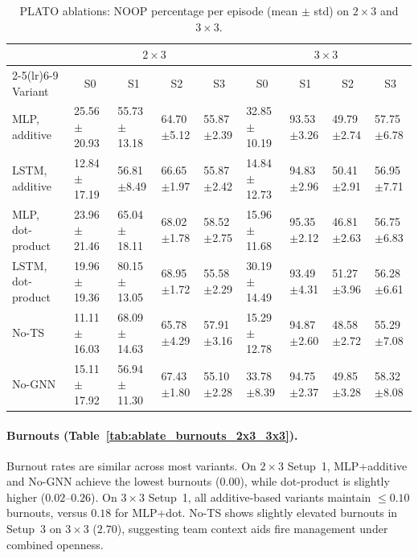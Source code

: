 \begin{table}[h]
\centering
\small
\setlength{\tabcolsep}{1.4pt}
\renewcommand{\arraystretch}{1.02}
\begin{tabular}{@{\hspace{2pt}}l|l|l|l|l||l|l|l|l@{\hspace{2pt}}}
\toprule
& \multicolumn{4}{c||}{$2\times 3$} & \multicolumn{4}{c}{$3\times 3$} \\
\cmidrule(lr){2-5}\cmidrule(lr){6-9}
Variant & \multicolumn{1}{c|}{S0} & \multicolumn{1}{c|}{S1} & \multicolumn{1}{c|}{S2} & \multicolumn{1}{c||}{S3}
        & \multicolumn{1}{c|}{S0} & \multicolumn{1}{c|}{S1} & \multicolumn{1}{c|}{S2} & \multicolumn{1}{c}{S3} \\
\midrule
MLP, additive      & 25.56$\pm$20.93 & 55.73$\pm$13.18 & 64.70$\pm$5.12 & 55.87$\pm$2.39
                  & 32.85$\pm$10.19 & 93.53$\pm$3.26 & 49.79$\pm$2.74 & 57.75$\pm$6.78 \\
LSTM, additive     & 12.84$\pm$17.19 & 56.81$\pm$8.49 & 66.65$\pm$1.97 & 55.87$\pm$2.42
                  & 14.84$\pm$12.73 & 94.83$\pm$2.96 & 50.41$\pm$2.91 & 56.95$\pm$7.71 \\
MLP, dot-product   & 23.96$\pm$21.46 & 65.04$\pm$18.11 & 68.02$\pm$1.78 & 58.52$\pm$2.75
                  & 15.96$\pm$11.68 & 95.35$\pm$2.12 & 46.81$\pm$2.63 & 56.75$\pm$6.83 \\
LSTM, dot-product  & 19.96$\pm$19.36 & 80.15$\pm$13.05 & 68.95$\pm$1.72 & 55.58$\pm$2.29
                  & 30.19$\pm$14.49 & 93.49$\pm$4.31 & 51.27$\pm$3.96 & 56.28$\pm$6.61 \\
No-TS              & 11.11$\pm$16.03 & 68.09$\pm$14.63 & 65.78$\pm$4.29 & 57.91$\pm$3.16
                  & 15.29$\pm$12.78 & 94.87$\pm$2.60 & 48.58$\pm$2.72 & 55.29$\pm$7.08 \\
No-GNN             & 15.11$\pm$17.92 & 56.94$\pm$11.30 & 67.43$\pm$1.80 & 55.10$\pm$2.28
                  & 33.78$\pm$8.39 & 94.75$\pm$2.37 & 49.85$\pm$3.28 & 58.32$\pm$8.08 \\
\bottomrule
\end{tabular}
\caption{PLATO ablations: NOOP percentage per episode (mean $\pm$ std) on $2\times 3$ and $3\times 3$.}
\label{tab:ablate_noop_2x3_3x3}
\end{table}


\paragraph{Burnouts (Table~\ref{tab:ablate_burnouts_2x3_3x3}).}
Burnout rates are similar across most variants. On $2\times 3$ Setup~1, MLP+additive and No-GNN achieve the lowest burnouts ($0.00$), while dot-product is slightly higher ($0.02$--$0.26$). On $3\times 3$ Setup~1, all additive-based variants maintain $\leq 0.10$ burnouts, versus $0.18$ for MLP+dot. No-TS shows slightly elevated burnouts in Setup~3 on $3\times 3$ ($2.70$), suggesting team context aids fire management under combined openness.

